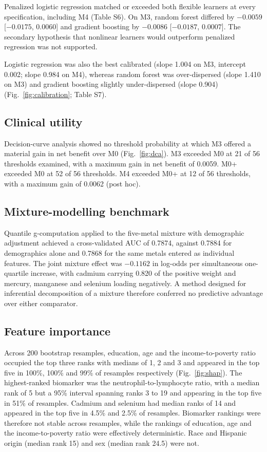 \documentclass[12pt]{article}
\begin{document}
Penalized logistic regression matched or exceeded both flexible learners at every specification, including M4 (Table S6). On M3, random forest differed by $-0.0059$ [$-0.0175$, $0.0060$] and gradient boosting by $-0.0086$ [$-0.0187$, $0.0007$]. The secondary hypothesis that nonlinear learners would outperform penalized regression was not supported.

Logistic regression was also the best calibrated (slope 1.004 on M3, intercept 0.002; slope 0.984 on M4), whereas random forest was over-dispersed (slope 1.410 on M3) and gradient boosting slightly under-dispersed (slope 0.904) (Fig.~\ref{fig:calibration}; Table S7).

\subsection*{Clinical utility}

Decision-curve analysis showed no threshold probability at which M3 offered a material gain in net benefit over M0 (Fig.~\ref{fig:dca}). M3 exceeded M0 at 21 of 56 thresholds examined, with a maximum gain in net benefit of 0.0059. M0+ exceeded M0 at 52 of 56 thresholds. M4 exceeded M0+ at 12 of 56 thresholds, with a maximum gain of 0.0062 (post hoc).

\subsection*{Mixture-modelling benchmark}

Quantile g-computation applied to the five-metal mixture with demographic adjustment achieved a cross-validated AUC of 0.7874, against 0.7884 for demographics alone and 0.7868 for the same metals entered as individual features. The joint mixture effect was $-0.1162$ in log-odds per simultaneous one-quartile increase, with cadmium carrying 0.820 of the positive weight and mercury, manganese and selenium loading negatively. A method designed for inferential decomposition of a mixture therefore conferred no predictive advantage over either comparator.

\subsection*{Feature importance}

Across 200 bootstrap resamples, education, age and the income-to-poverty ratio occupied the top three ranks with medians of 1, 2 and 3 and appeared in the top five in 100\%, 100\% and 99\% of resamples respectively (Fig.~\ref{fig:shap}). The highest-ranked biomarker was the neutrophil-to-lymphocyte ratio, with a median rank of 5 but a 95\% interval spanning ranks 3 to 19 and appearing in the top five in 51\% of resamples. Cadmium and selenium had median ranks of 14 and appeared in the top five in 4.5\% and 2.5\% of resamples. Biomarker rankings were therefore not stable across resamples, while the rankings of education, age and the income-to-poverty ratio were effectively deterministic. Race and Hispanic origin (median rank 15) and sex (median rank 24.5) were not.
\end{document}
